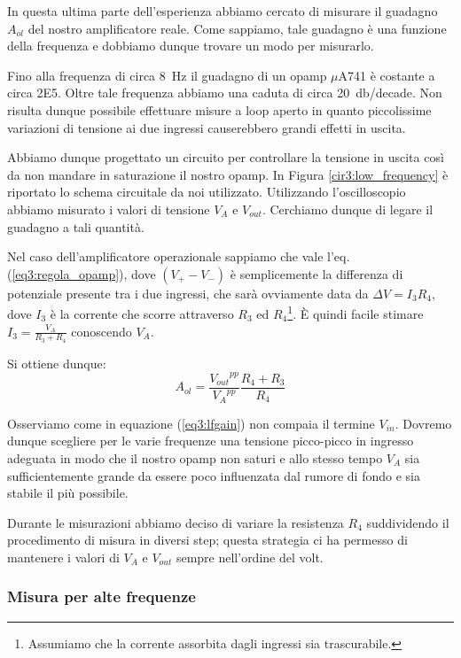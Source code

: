 In questa ultima parte dell'esperienza abbiamo cercato di misurare il guadagno $A_{ol}$ del nostro amplificatore reale.
Come sappiamo, tale guadagno è una funzione della frequenza e dobbiamo dunque trovare un modo per misurarlo.

Fino alla frequenza di circa \SI{8}{\hertz} il guadagno di un opamp $\mu$A741 è costante a circa \num{2E5}.
Oltre tale frequenza abbiamo una caduta di circa \SI{20}{\decibel}/decade.
Non risulta dunque possibile effettuare misure a loop aperto in quanto piccolissime variazioni di tensione ai due ingressi causerebbero grandi effetti in uscita.

Abbiamo dunque progettato un circuito per controllare la tensione in uscita così da non mandare in saturazione il nostro opamp.
In Figura \ref{cir3:low_frequency} è riportato lo schema circuitale da noi utilizzato.
Utilizzando l'oscilloscopio abbiamo misurato i valori di tensione $V_A$ e $V_{out}$. Cerchiamo dunque di legare il guadagno a tali quantità.

Nel caso dell'amplificatore operazionale sappiamo che vale l'eq. (\ref{eq3:regola_opamp}), dove $(V_+-V_-)$ è semplicemente la differenza di potenziale presente tra i due ingressi, che sarà ovviamente data da $\Delta V = I_3R_4$, dove $I_3$ è la corrente che scorre attraverso $R_3$ ed $R_4$\footnote{Assumiamo che la corrente assorbita dagli ingressi sia trascurabile.}.
È quindi facile stimare $I_3=\frac{V_A}{R_3+R_4}$ conoscendo $V_A$.

Si ottiene dunque:
\begin{equation}
A_{ol}=\frac{{V_{out}}^{pp}}{{V_A}^{pp}} \frac{R_4+R_3}{R_4}
\label{eq3:lfgain}
\end{equation}

Osserviamo come in equazione (\ref{eq3:lfgain}) non compaia il termine $V_{in}$.
Dovremo dunque scegliere per le varie frequenze una tensione picco-picco in ingresso adeguata in modo che il nostro opamp non saturi e allo stesso tempo $V_A$ sia sufficientemente grande da essere poco influenzata dal rumore di fondo e sia stabile il più possibile.

Durante le misurazioni abbiamo deciso di variare la resistenza $R_4$ suddividendo il procedimento di misura in diversi step; questa strategia ci ha permesso di mantenere i valori di $V_A$ e $V_{out}$ sempre nell'ordine del volt. 

\subsubsection*{Misura per alte frequenze}

